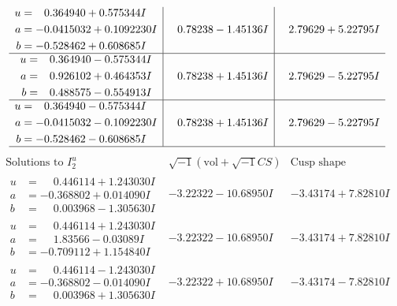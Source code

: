 \documentclass[1p]{elsarticle_modified}
\theoremstyle{definition}
\newcommand{\I}{\sqrt{-1}}
\begin{document}
$$\begin{array}{c|c|c}
\begin{aligned}
u &= \phantom{-}0.364940 + 0.575344 I \\
a &= -0.0415032 + 0.1092230 I \\
b &= -0.528462 + 0.608685 I\end{aligned}
 & \phantom{-}0.78238 - 1.45136 I & \phantom{-}2.79629 + 5.22795 I \\ \hline\begin{aligned}
u &= \phantom{-}0.364940 - 0.575344 I \\
a &= \phantom{-}0.926102 + 0.464353 I \\
b &= \phantom{-}0.488575 - 0.554913 I\end{aligned}
 & \phantom{-}0.78238 + 1.45136 I & \phantom{-}2.79629 - 5.22795 I \\ \hline\begin{aligned}
u &= \phantom{-}0.364940 - 0.575344 I \\
a &= -0.0415032 - 0.1092230 I \\
b &= -0.528462 - 0.608685 I\end{aligned}
 & \phantom{-}0.78238 + 1.45136 I & \phantom{-}2.79629 - 5.22795 I\\
 \hline 
 \end{array}$$\newpage$$\begin{array}{c|c|c}  
\text{Solutions to }I^u_{2}& \I (\text{vol} + \sqrt{-1}CS) & \text{Cusp shape}\\
 \hline 
\begin{aligned}
u &= \phantom{-}0.446114 + 1.243030 I \\
a &= -0.368802 + 0.014090 I \\
b &= \phantom{-}0.003968 - 1.305630 I\end{aligned}
 & -3.22322 - 10.68950 I & -3.43174 + 7.82810 I \\ \hline\begin{aligned}
u &= \phantom{-}0.446114 + 1.243030 I \\
a &= \phantom{-}1.83566 - 0.03089 I \\
b &= -0.709112 + 1.154840 I\end{aligned}
 & -3.22322 - 10.68950 I & -3.43174 + 7.82810 I \\ \hline\begin{aligned}
u &= \phantom{-}0.446114 - 1.243030 I \\
a &= -0.368802 - 0.014090 I \\
b &= \phantom{-}0.003968 + 1.305630 I\end{aligned}
 & -3.22322 + 10.68950 I & -3.43174 - 7.82810 I \\ \hline\begin{aligned}

\end{aligned}
\end{array}$$
\end{document}
